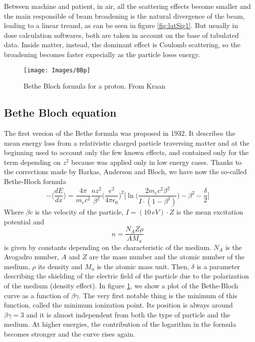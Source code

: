 \documentclass[12pt, a4paper, twoside]{book}
\begin{document}
Between machine and patient, in air, all the scattering effects become smaller and the main responsible of beam broadening is the natural divergence of the beam, leading to a linear treand, as can be seen in figure \ref{fig:latSig1}.
But usually in dose calculation softwares, both are taken in account on the base of tabulated data. Inside matter, instead, the dominant effect is Coulomb scattering, so the broadening becomes faster expecially as the particle loses energy.

\begin{figure}[!ht]
{\texttt{[image: Images/BBp]}}
\caption{Bethe Bloch formula for a proton. From Kraan \cite{Kra:range}}
\label{fig:BB}
\end{figure}

\subsection{Bethe Bloch equation}
The first version of the Bethe formula was proposed in 1932. It describes the mean energy loss from a relativistic charged particle traversing matter and at the beginning used to account only the few known effects, and contained only for the term depending on $z^2$ because was applied only in low energy cases.
Thanks to the corrections made by Barkas, Anderson and Bloch, we have now the so-called Bethe-Bloch formula
\[
-\bigg\langle\frac{dE}{dx}\bigg\rangle= \frac{4\pi}{m_ec^2}\frac{nz^2}{\beta^2}\bigg(\frac{e^2}{4\pi\epsilon_0} \bigg)^2\bigg[\ln{\bigg(\frac{2m_ec^2\beta^2}{I\cdot(1-\beta^2)}\bigg)}-\beta^2 -\frac{\delta}{2}\bigg]
\]
Where $\beta c$ is the velocity of the particle, $I=(10\,eV)\cdot Z$ is the mean excitation potential and 
\[
n = \frac{N_AZ\rho}{AM_u}
\]
is given by constants depending on the characteristic of the medium. $N_A$ is the Avogadro number, $A$ and $Z$ are the mass number and the atomic number of the medium, $\rho$ its density and $M_u$ is the atomic mass unit. Then, $\delta$ is a parameter describing the shielding of the electric field of the particle due to the polarization of the medium (density effect).
In figure \ref{fig:BB}, we show a plot of the Bethe-Bloch curve as a function of $\beta\gamma$. The very first notable thing is the minimum of this function, called the minimum ionization point. Its position is always around $\beta\gamma=3$ and it is almost independent from both the type of particle and the medium. At higher energies, the contribution of the logarithm in the formula becomes stronger and the curve rises again.
\end{document}

